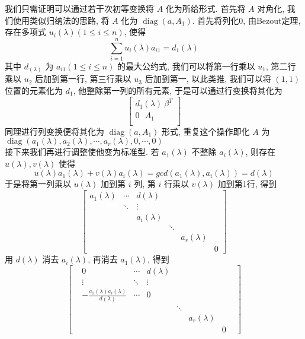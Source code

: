 \documentclass[UTF8]{ctexart}
\DeclareMathOperator{\0}{\mathbf{0}}
\DeclareMathOperator{\<}{\langle}
\renewcommand{\>}{\rangle}
\DeclareMathOperator{\diag}{diag}
\begin{document}
        \begin{prf}
            我们只需证明可以通过若干次初等变换将 \(A\) 化为所给形式. 首先将 \(A\) 对角化, 我们使用类似归纳法的思路, 将 \(A\) 化为 \(\diag(a,A_1)\).
            首先将列化0, 由Bezout定理, 存在多项式 \(u_i(\lambda)(1\leq i\leq n)\), 使得
            \[\sum_{i=1}^nu_i(\lambda)a_{i1}=d_1(\lambda)\]
            其中 \(d_(\lambda)\) 为 \(a_{i1}(1\leq i\leq n)\) 的最大公约式, 我们可以将第一行乘以 \(u_1\), 第二行乘以 \(u_2\) 后加到第一行, 第三行乘以 \(u_3\) 后加到第一, 以此类推, 我们可以将 \((1,1)\) 位置的元素化为 \(d_1\), 他整除第一列的所有元素, 于是可以通过行变换将其化为
            \[\begin{bmatrix}
                d_1(\lambda)\  \beta^{T}\\
                0 \ \ \  A_1\\
            \end{bmatrix}\]
            同理进行列变换便将其化为 \(\diag(a,A_1)\) 形式, 重复这个操作即化 \(A\) 为 \(\diag(a_1(\lambda),a_2(\lambda),\cdots,a_r(\lambda),0,\cdots,0)\) \\
            接下来我们再进行调整使他变为标准型. 若 \(a_1(\lambda)\) 不整除 \(a_i(\lambda)\), 则存在 \(u(\lambda),v(\lambda)\) 使得\[
            u(\lambda)a_1(\lambda)+v(\lambda)a_i(\lambda)=gcd(a_1(\lambda),a_i(\lambda))=d(\lambda)
            \]
            于是将第一列乘以 \(u(\lambda)\) 加到第 \(i\) 列, 第 \(i\) 行乘以 \(v(\lambda)\) 加到第1行, 得到
            \[\begin{bmatrix}a_1(\lambda)&\cdots&d(\lambda)\\
            &\ddots&\vdots\\
            &&a_i(\lambda)\\
            &&&\ddots\\
            &&&&a_r(\lambda)\\
            &&&&&0
            \end{bmatrix}
            \]
            用 \(d(\lambda)\) 消去 \(a_i(\lambda)\), 再消去 \(a_1(\lambda)\), 得到
            \[\begin{bmatrix}
            &0&\cdots&d(\lambda)&&&&\\
            &\vdots&\ddots&\vdots&&&&\\
            &-\frac{a_1(\lambda)a_i(\lambda)}{d(\lambda)}&\cdots &0&&&&\\
            &&&&\ddots&&&\\
            &&&&&a_r(\lambda)&&\\
            &&&&&&0
            \end{bmatrix}\]

\end{prf}
\end{document}
